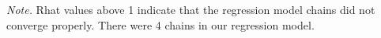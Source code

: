\documentclass[review]{elsarticle} %
\begin{document}
\begin{table}[hbt!]
\begin{center}
\begin{threeparttable}
{}

\begin{tablenotes}[para]
\normalsize{\textit{Note.} Rhat values above 1 indicate that the regression model chains did not converge properly. There were 4 chains in our regression model.}
\end{tablenotes}

\end{threeparttable}
\end{center}

\end{table}

\clearpage

\renewcommand\refname{References}

\end{document}
